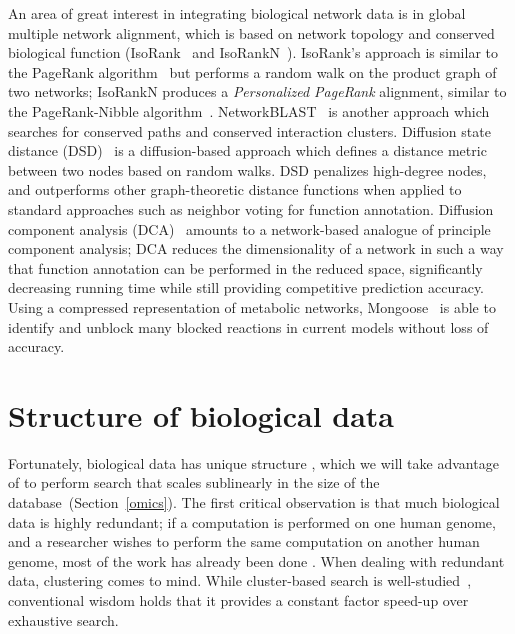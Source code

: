 \documentclass{acm_proc_article-sp}
\begin{document}
An area of great interest in integrating biological network data is in global multiple network 
alignment, which is based on network topology and conserved biological function (IsoRank~\cite{singh2008global} and IsoRankN~\cite{liao2009isorankn}).
IsoRank's approach is similar to the PageRank algorithm~\cite{berger2013computational} 
but performs a random walk on the product graph of two networks;
IsoRankN produces a \emph{Personalized PageRank} alignment, similar to the
PageRank-Nibble algorithm~\cite{berger2013computational}.
NetworkBLAST~\cite{atias2012comparative} is another approach which searches for 
conserved paths and conserved interaction clusters.
Diffusion state distance (DSD)~\cite{cao2013going} is a diffusion-based approach
which defines a distance metric between two nodes based on random walks.
DSD penalizes high-degree nodes, and outperforms other graph-theoretic distance
functions when applied to standard approaches such as neighbor voting for function annotation.
Diffusion component analysis (DCA)~\cite{cho2015diffusion} amounts to a network-based 
analogue of principle component analysis; DCA reduces the dimensionality of a
network in such a way that function annotation can be performed in the reduced 
space, significantly decreasing running time while still providing competitive
prediction accuracy.
Using a compressed representation of metabolic networks, 
Mongoose~\cite{chindelevitch2014exact} is able to 
identify and unblock many blocked reactions in current models without loss of 
accuracy.


\section{Structure of biological data}\label{structure}

Fortunately, biological data has unique structure \cite{yu2015entropy}, which we 
will take advantage of to perform search that scales sublinearly in the size of the database~(Section~\ref{omics}).
The first critical observation is that
much biological data is highly redundant; if a computation is performed on one
human genome, and a researcher wishes to perform the same computation on another
human genome, most of the work has already been done \cite{loh2012compressive}.
When dealing with redundant data, clustering comes to mind.
While cluster-based search is well-studied~\cite{jardine1971use}, conventional
wisdom holds that it provides a constant factor speed-up over exhaustive search.
\end{document}
